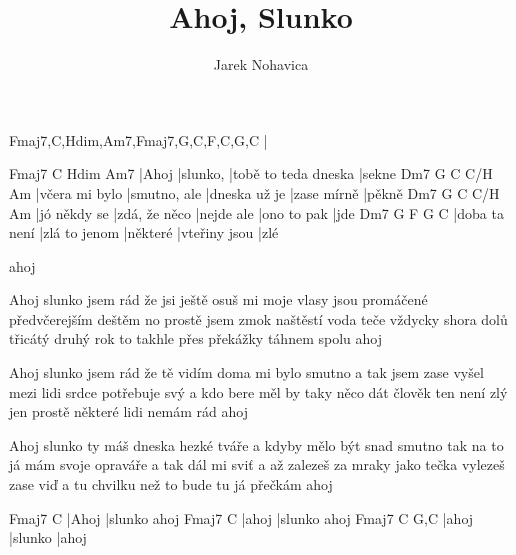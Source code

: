 \documentclass{song}
\title{Ahoj, Slunko}
\author{Jarek Nohavica}
\begin{document}
\strophe
Fmaj7,C,Hdim,Am7,Fmaj7,G,C,F,C,G,C
|
\endstrophe

\strophe
Fmaj7  C       Hdim                 Am7
|Ahoj  |slunko, |tobě to teda dneska |sekne
Dm7            G            C             C/H         Am
|včera mi bylo |smutno, ale |dneska už je |zase mírně |pěkně
Dm7          G             C          C/H         Am
|jó někdy se |zdá, že něco |nejde ale |ono to pak |jde
Dm7           G             F        G             C
|doba ta není |zlá to jenom |některé |vteřiny jsou |zlé

ahoj
\endstrophe

\strophe*
Ahoj slunko jsem rád že jsi ještě
osuš mi moje vlasy jsou promáčené předvčerejším deštěm
no prostě jsem zmok naštěstí voda teče vždycky shora dolů
třicátý druhý rok to takhle přes překážky táhnem spolu
ahoj
\endstrophe

\strophe*
Ahoj slunko jsem rád že tě vidím
doma mi bylo smutno a tak jsem zase vyšel mezi lidi
srdce potřebuje svý a kdo bere měl by taky něco dát
člověk ten není zlý jen prostě některé lidi nemám rád
ahoj
\endstrophe

\strophe*
Ahoj slunko ty máš dneska hezké tváře
a kdyby mělo být snad smutno tak na to já mám svoje opraváře
a tak dál mi sviť a až zalezeš za mraky jako tečka
vylezeš zase viď a tu chvilku než to bude tu já přečkám
ahoj
\endstrophe

\strophe
Fmaj7  C
|Ahoj  |slunko ahoj
Fmaj7  C
|ahoj  |slunko ahoj
Fmaj7  C       G,C
|ahoj  |slunko |ahoj
\endstrophe

\end{document}
